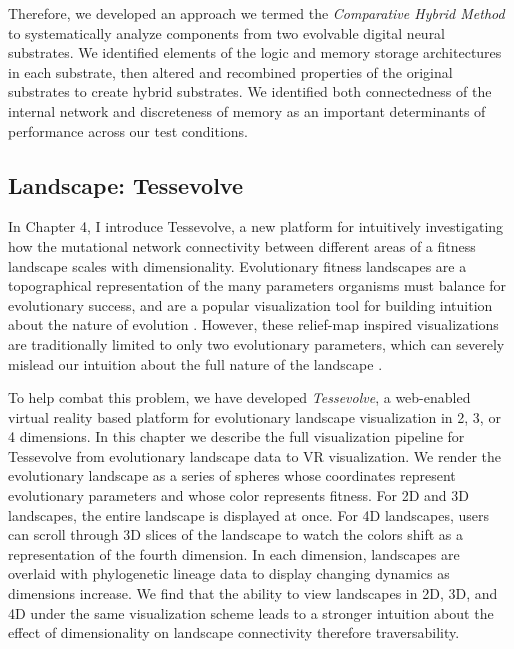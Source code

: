 Therefore, we developed an approach we termed the \textit{Comparative Hybrid Method} to systematically analyze components from two evolvable digital neural substrates.
We identified elements of the logic and memory storage architectures in each substrate, then altered and recombined properties of the original substrates to create hybrid substrates. 
We identified both connectedness of the internal network and discreteness of memory as an important determinants of performance across our test conditions.

\subsection{Landscape: Tessevolve}

In Chapter 4, I introduce Tessevolve, a new platform for intuitively investigating how the mutational network connectivity between different areas of a fitness landscape scales with dimensionality. 
Evolutionary fitness landscapes are a topographical representation of the many parameters organisms must balance for evolutionary success, and are a popular visualization tool for building intuition about the nature of evolution \citep{wright_roles_1932}. 
However, these relief-map inspired visualizations are traditionally limited to only two evolutionary parameters, which can severely mislead our intuition about the full nature of the landscape \citep{kaplan_end_2008, agarwala_adaptive_2019}. 

To help combat this problem, we have developed \textit{Tessevolve}, a web-enabled virtual reality based platform for evolutionary landscape visualization in 2, 3, or 4 dimensions. 
In this chapter we describe the full visualization pipeline for Tessevolve from evolutionary landscape data to VR visualization. 
We render the evolutionary landscape as a series of spheres whose coordinates represent evolutionary parameters and whose color represents fitness. For 2D and 3D landscapes, the entire landscape is displayed at once. 
For 4D landscapes, users can scroll through 3D slices of the landscape to watch the colors shift as a representation of the fourth dimension. In each dimension, landscapes are overlaid with phylogenetic lineage data to display changing dynamics as dimensions increase. 
We find that the ability to view landscapes in 2D, 3D, and 4D under the same visualization scheme leads to a stronger intuition about the effect of dimensionality on landscape connectivity therefore traversability. 